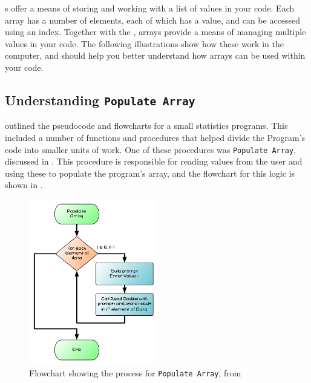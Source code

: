 s offer a means of storing and working with a list of values in your code. Each array has a number of elements, each of which has a value, and can be accessed using an index. Together with the , arrays provide a means of managing multiple values in your code. The following illustrations show how these work in the computer, and should help you better understand how arrays can be used within your code.

\subsection{Understanding \texttt{Populate Array}} %
\label{sub:understanding_populate_array}

  outlined the pseudocode and flowcharts for a small statistics programs. This included a number of functions and procedures that helped divide the Program's code into smaller units of work. One of these procedures was \texttt{Populate Array}, discussed in  . This procedure is responsible for reading values from the user and using these to populate the program's array, and the flowchart for this logic is shown in .

\begin{figure}[htbp]
   \centering
   \includegraphics[width=0.5\textwidth]{./topics/arrays/diagrams/PopulateArray} 
   \caption{Flowchart showing the process for \texttt{Populate Array}, from }
   \label{fig:populate-array-flow-understanding}
\end{figure}

